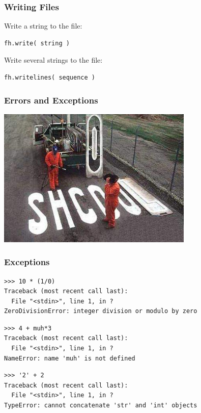 \documentclass[t,10pt,compress=false,usepdftitle=false]{beamer}
\begin{document}
\begin{frame}[fragile]
    \frametitle{Writing Files}
Write a string to the file:
    \begin{myColorBox}{0.9}{}
\begin{verbatim}
fh.write( string )
\end{verbatim}
    \end{myColorBox}
\pause
Write several strings to the file:
    \begin{myColorBox}{0.9}{}
\begin{verbatim}
fh.writelines( sequence )
\end{verbatim}
    \end{myColorBox}
\end{frame}

\begin{frame}[fragile]
    \frametitle{Errors and Exceptions}
    \begin{center}
      \includegraphics[width=0.7\textwidth]{shcool.jpg}
    \end{center}
\end{frame}

\begin{frame}[fragile]
    \frametitle{Exceptions}
    \begin{myColorBox}{0.9}{}
\small
\begin{verbatim}
>>> 10 * (1/0)
Traceback (most recent call last):
  File "<stdin>", line 1, in ?
ZeroDivisionError: integer division or modulo by zero
\end{verbatim}
    \end{myColorBox}
    \pause    
    \begin{myColorBox}{0.9}{}
\small
\begin{verbatim}
>>> 4 + muh*3
Traceback (most recent call last):
  File "<stdin>", line 1, in ?
NameError: name 'muh' is not defined
\end{verbatim}
    \end{myColorBox}
    \pause    
    \begin{myColorBox}{0.9}{}
\small
\begin{verbatim}
>>> '2' + 2
Traceback (most recent call last):
  File "<stdin>", line 1, in ?
TypeError: cannot concatenate 'str' and 'int' objects
\end{verbatim}
    \end{myColorBox}
\end{frame}
\end{document}
